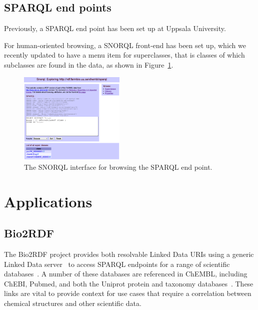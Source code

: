 \documentclass[sw]{iosart2c}
\begin{document}
\subsection{SPARQL end points}

Previously, a SPARQL end point has been set up at Uppsala University.

For human-oriented browsing, a SNORQL front-end has been set up, which we
recently updated to have a menu item for superclasses, that is classes
of which subclasses are found in the data, as shown in Figure~\ref{f2}.

\begin{figure}[bt]
\includegraphics[width=0.45\textwidth]{snorql}
\caption{The SNORQL interface for browsing the SPARQL end point.}\label{f2}
\end{figure}

\section{Applications}

\subsection{Bio2RDF}


The Bio2RDF project provides both resolvable Linked Data URIs using a generic Linked Data
server~\cite{Ansell2011} to access SPARQL endpoints for a range of scientific databases~\cite{Belleau2008}.
A number of these databases are referenced in ChEMBL, including ChEBI, Pubmed, and both the
Uniprot protein and taxonomy databases~\cite{TheUniProtConsortium2010}. These links are
vital to provide context for use cases that require a correlation between chemical
structures and other scientific data. 
\end{document}
